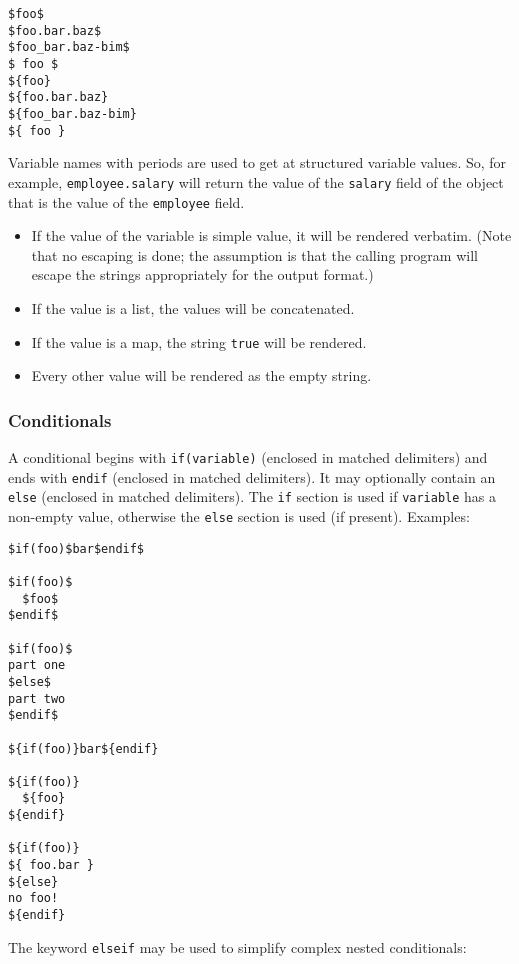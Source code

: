 \documentclass[]{article}
\providecommand{\tightlist}{%
  \setlength{\itemsep}{0pt}\setlength{\parskip}{0pt}}
\begin{document}
\begin{verbatim}
$foo$
$foo.bar.baz$
$foo_bar.baz-bim$
$ foo $
${foo}
${foo.bar.baz}
${foo_bar.baz-bim}
${ foo }
\end{verbatim}

Variable names with periods are used to get at structured variable
values. So, for example, \texttt{employee.salary} will return the value
of the \texttt{salary} field of the object that is the value of the
\texttt{employee} field.

\begin{itemize}
\tightlist
\item
  If the value of the variable is simple value, it will be rendered
  verbatim. (Note that no escaping is done; the assumption is that the
  calling program will escape the strings appropriately for the output
  format.)
\item
  If the value is a list, the values will be concatenated.
\item
  If the value is a map, the string \texttt{true} will be rendered.
\item
  Every other value will be rendered as the empty string.
\end{itemize}

\hypertarget{conditionals}{%
\subsubsection{Conditionals}\label{conditionals}}

A conditional begins with \texttt{if(variable)} (enclosed in matched
delimiters) and ends with \texttt{endif} (enclosed in matched
delimiters). It may optionally contain an \texttt{else} (enclosed in
matched delimiters). The \texttt{if} section is used if
\texttt{variable} has a non-empty value, otherwise the \texttt{else}
section is used (if present). Examples:

\begin{verbatim}
$if(foo)$bar$endif$

$if(foo)$
  $foo$
$endif$

$if(foo)$
part one
$else$
part two
$endif$

${if(foo)}bar${endif}

${if(foo)}
  ${foo}
${endif}

${if(foo)}
${ foo.bar }
${else}
no foo!
${endif}
\end{verbatim}

The keyword \texttt{elseif} may be used to simplify complex nested
conditionals:
\end{document}
